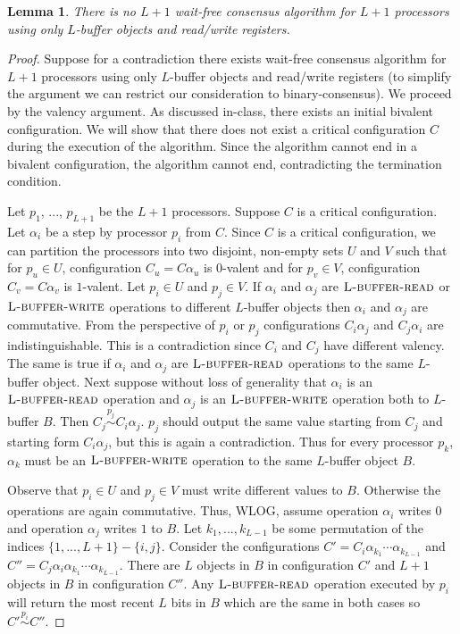 \documentclass[11pt]{article}
\newcommand\lbufread{\textsc{L-buffer-read}}
\newcommand\lbufwrite{\textsc{L-buffer-write}}
\newtheorem{lemma}[theorem]{Lemma}
\begin{document}
\begin{lemma}
\label{lem:nol+1procwaitfree}
There is no $L+1$ wait-free consensus algorithm for $L+1$ processors using only $L$-buffer objects and read/write registers.
\end{lemma}
\begin{proof}
Suppose for a contradiction there exists wait-free consensus algorithm for $L+1$ processors using only $L$-buffer objects and read/write registers (to simplify the argument we can restrict our consideration to binary-consensus). We proceed by the valency argument. As discussed in-class, there exists an initial bivalent configuration. We will show that there does not exist a critical configuration $C$ during the execution of the algorithm. Since the algorithm cannot end in a bivalent configuration, the algorithm cannot end, contradicting the termination condition.

Let $p_1$, ..., $p_{L+1}$ be the $L+1$ processors. Suppose $C$ is a critical configuration. Let $\alpha_i$ be a step by processor $p_i$ from $C$. Since $C$ is a critical configuration, we can partition the processors into two disjoint, non-empty sets $U$ and $V$ such that for $p_u \in U$, configuration $C_u = C\alpha_u$ is $0$-valent and for $p_v \in V$, configuration $C_v = C\alpha_v$ is $1$-valent. Let $p_i \in U$ and $p_j \in V$. If $\alpha_i$ and $\alpha_j$ are $\lbufread$ or $\lbufwrite$ operations to different $L$-buffer objects then $\alpha_i$ and $\alpha_j$ are commutative. From the perspective of $p_i$ or $p_j$ configurations $C_i \alpha_j$ and $C_j\alpha_i$ are indistinguishable. This is a contradiction since $C_i$ and $C_j$ have different valency. The same is true if $\alpha_i$ and $\alpha_j$ are $\lbufread$ operations to the same $L$-buffer object. Next suppose without loss of generality that $\alpha_i$ is an $\lbufread$ operation and $\alpha_j$ is an $\lbufwrite$ operation both to $L$-buffer $B$. Then $C_j \stackrel{p_j}{\sim} C_i\alpha_j$. $p_j$ should output the same value starting from $C_j$ and starting form $C_i \alpha_j$, but this is again a contradiction. Thus for every processor $p_k$, $\alpha_k$ must be an $\lbufwrite$ operation to the same $L$-buffer object $B$. 

Observe that $p_i \in U$ and $p_j \in V$ must write different values to $B$. Otherwise the operations are again commutative. Thus, WLOG, assume operation $\alpha_i$ writes $0$ and operation $\alpha_j$ writes $1$ to $B$. Let $k_1, ..., k_{L-1}$ be some permutation of the indices $\{1, ..., L+1\} - \{i, j\}$. Consider the configurations $C' = C_i\alpha_{k_1}\cdots\alpha_{k_{L-1}}$ and $C'' = C_j\alpha_i\alpha_{k_1}\cdots\alpha_{k_{L-1}}$. There are $L$ objects in $B$ in configuration $C'$ and $L+1$ objects in $B$ in configuration $C''$. Any $\lbufread$ operation executed by $p_i$ will return the most recent $L$ bits in $B$ which are the same in both cases so $C' \stackrel{p_i}{\sim} C''$. 


\end{proof}
\end{document}

